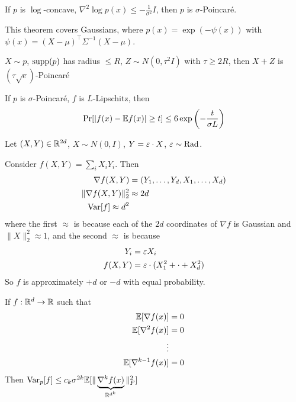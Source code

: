 \begin{theorem}
  If $p$ is $\log$-concave, $\nabla^2 \log p(x) \leq -\frac{1}{\sigma^2} I$,
  then $p$ is $\sigma$-Poincar\'e.
\end{theorem}

\begin{remark}
  This theorem covers Gaussians, where
  $p(x) = \exp(-\psi(x))$ with $\psi(x) = (X - \mu)^\top \Sigma^{-1} (X - \mu)$.
\end{remark}

\begin{theorem}
  $X \sim p$, $\operatorname{supp}(p)$ has radius $\leq R$,
  $Z \sim N(0, \tau^2 I)$ with $\tau \geq 2 R$,
  then $X + Z$ is $(\tau \sqrt{e})$-Poincar\'e
\end{theorem}

\begin{theorem}
  If $p$ is $\sigma$-Poincar\'e, $f$ is $L$-Lipschitz, then
  \begin{align}
    \Pr[\lvert f(x) - \mathbb{E} f(x) \rvert \geq t] \leq 6 \exp\left(-\frac{t}{\sigma L}\right)
  \end{align}
\end{theorem}

\begin{example}
  Let $(X,Y) \in \mathbb{R}^{2d}$, $X \sim N(0, I)$, $Y = \varepsilon \cdot X$,
  $\varepsilon \sim \text{Rad}$.

  Consider $f(X, Y) = \sum_i X_i Y_i$. Then
  \begin{align}
    \nabla f(X, Y) &= (Y_1, \ldots, Y_d, X_1, \ldots, X_d) \\
    \| \nabla f(X, Y)\|_2^2 &\approx 2d \\
    \operatorname{Var}[f] \approx d^2
  \end{align}
  where the first $\approx$ is because each of the $2d$ coordinates of
  $\nabla f$ is Gaussian and $\|X\|_2^2 \approx 1$, and the second
  $\approx$ is because
  \begin{align}
    Y_i &= \varepsilon X_i \\
    f(X, Y) &= \varepsilon \cdot (X_1^2 + \cdot + X_d^2)
  \end{align}
  So $f$ is approximately $+d$ or $-d$ with equal probability.
\end{example}


\begin{theorem}
  If $f : \mathbb{R}^d \to \mathbb{R}$ such that
  \begin{align}
    \mathbb{E}[\nabla f(x)] &= 0 \\
    \mathbb{E}[\nabla^2 f(x)] &= 0 \\
    \vdots& \\
    \mathbb{E}[\nabla^{k-1} f(x)] &= 0
  \end{align}
  Then $\operatorname{Var}_p[f] \leq c_k \sigma^{2k} \mathbb{E}[\|\underbrace{\nabla^k f(x)}_{\mathbb{R}^{d^k}} \|_F^2]$
\end{theorem}

